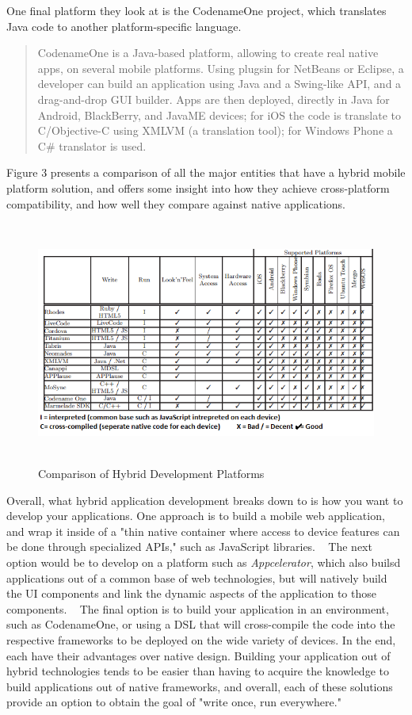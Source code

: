 \documentclass[11pt, twocolumn]{article}
\begin{document}
One final platform they look at is the CodenameOne project, which translates Java code to another platform-specific language.

\begin{quote}
CodenameOne is a Java-based platform, allowing to create real native apps, on several mobile platforms. Using plugsin for NetBeans or Eclipse, a developer can build an application using Java and a Swing-like API, and a drag-and-drop GUI builder.  Apps are then deployed, directly in Java for Android, BlackBerry, and JavaME devices; for iOS the code is translate to C/Objective-C using XMLVM (a translation tool); for Windows Phone a C\# translator is used. ~\cite{Goaer2013}
\end{quote}

Figure 3 presents a comparison of all the major entities that have a hybrid mobile platform solution, and offers some insight into how they achieve cross-platform compatibility, and how well they compare against native applications.\\

\begin{figure}
\includegraphics[width=\textwidth, height=8cm]{cross-platform-chart}
\caption{Comparison of Hybrid Development Platforms ~\cite{Goaer2013}}
\end{figure}

Overall, what hybrid application development breaks down to is how you want to develop your applications.  One approach is to build a mobile web application, and wrap it inside of a "thin native container where access to device features can be done through specialized APIs," such as JavaScript libraries. ~\cite{Xanthopoulos2013}  The next option would be to develop on a platform such as {\it Appcelerator}, which also builsd applications out of a common base of web technologies, but will natively build the UI components and link the dynamic aspects of the application to those components. ~\cite{Xanthopoulos2013}  The final option is to build your application in an environment, such as CodenameOne, or using a DSL that will cross-compile the code into the respective frameworks to be deployed on the wide variety of devices.  In the end, each have their advantages over native design.  Building your application out of hybrid technologies tends to be easier than having to acquire the knowledge to build applications out of native frameworks, and overall, each of these solutions provide an option to obtain the goal of "write once, run everywhere." ~\cite{Goaer2013}
\end{document}
